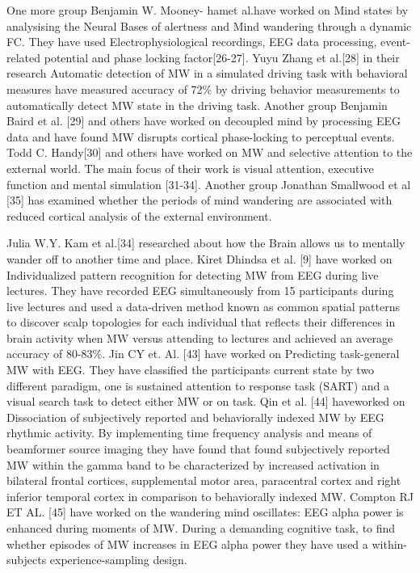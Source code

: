 One more group Benjamin W. Mooney- hamet al.have worked on Mind states by analysising the Neural Bases of alertness and Mind wandering through a dynamic FC. They have used Electrophysiological recordings, EEG data processing, event-related potential and phase locking factor[26-27]. Yuyu Zhang et al.[28] in their research Automatic detection of MW in a simulated driving task with behavioral measures have measured accuracy of 72\% by driving behavior measurements to automatically detect MW state in the driving task. Another group Benjamin Baird et al. [29] and others have worked on decoupled mind by processing EEG data and have found MW disrupts cortical phase-locking to perceptual events. Todd C. Handy[30] and others have worked on MW and selective attention to the external world. The main focus of their work is visual attention, executive function and mental simulation [31-34]. Another group Jonathan Smallwood et al [35] has examined whether the periods of mind wandering are associated with reduced cortical analysis of the external environment. 

Julia W.Y. Kam et al.[34] researched about how the Brain allows us to mentally wander off to another time and place. Kiret Dhindsa et al. [9] have worked on Individualized pattern recognition for detecting MW from EEG during live lectures. They have recorded EEG simultaneously from 15 participants during live lectures and used a data-driven method known as common spatial patterns to discover scalp topologies for each individual that reflects their differences in brain activity when MW versus attending to lectures and achieved an average accuracy of 80-83\%. Jin CY et. Al. [43] have worked on Predicting task-general MW with EEG. They have classified the participants current state by two different paradigm, one is sustained attention to response task (SART) and a visual search task to detect either MW or on task. Qin et al. [44] haveworked on Dissociation of subjectively reported and behaviorally indexed MW by EEG rhythmic activity. By implementing time frequency analysis and means of beamformer source imaging they have found that found subjectively reported MW within the gamma band to be characterized by increased activation in bilateral frontal cortices, supplemental motor area, paracentral cortex and right inferior temporal cortex in comparison to behaviorally indexed MW. Compton RJ ET AL. [45] have worked on the wandering mind oscillates: EEG alpha power is enhanced during moments of MW. During a demanding cognitive task, to find whether episodes of MW increases in EEG alpha power they have used a within-subjects experience-sampling design. 

